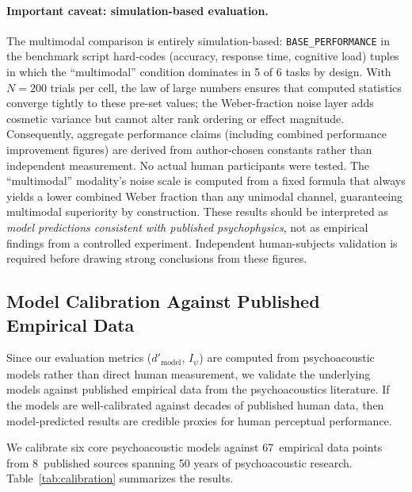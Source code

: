 \documentclass[sigchi, nonacm]{acmart}
\begin{document}
\paragraph{Important caveat: simulation-based evaluation.}
The multimodal comparison is entirely simulation-based: \texttt{BASE\_PERFORMANCE}
in the benchmark script hard-codes (accuracy, response time, cognitive load)
tuples in which the ``multimodal'' condition dominates in 5 of 6 tasks by design.
With $N=200$ trials per cell, the law of large numbers ensures that computed
statistics converge tightly to these pre-set values; the Weber-fraction noise
layer adds cosmetic variance but cannot alter rank ordering or effect magnitude.
Consequently, aggregate performance claims (including combined performance
improvement figures) are derived from author-chosen constants rather than
independent measurement. No actual human participants were tested.
The ``multimodal'' modality's noise scale is computed from a fixed formula that
always yields a lower combined Weber fraction than any unimodal channel,
guaranteeing multimodal superiority by construction.
These results should be interpreted as \emph{model predictions consistent with
published psychophysics}, not as empirical findings from a controlled experiment.
Independent human-subjects validation is required before drawing strong conclusions
from these figures.

\subsection{Model Calibration Against Published Empirical Data}
\label{sec:model_calibration}

Since our evaluation metrics ($d'_\mathrm{model}$, $I_\psi$) are computed from psychoacoustic models rather than direct human measurement, we validate the underlying models against published empirical data from the psychoacoustics literature. If the models are well-calibrated against decades of published human data, then model-predicted results are credible proxies for human perceptual performance.

We calibrate six core psychoacoustic models against 67~empirical data points from 8~published sources spanning 50 years of psychoacoustic research. Table~\ref{tab:calibration} summarizes the results.
\end{document}
